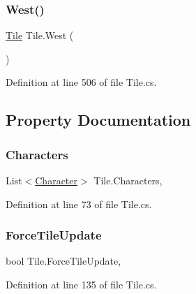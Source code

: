 \subsubsection{\texorpdfstring{West()}{West()}}
{\footnotesize\ttfamily \hyperlink{class_tile}{Tile} Tile.\+West (\begin{DoxyParamCaption}{ }\end{DoxyParamCaption})}



Definition at line 506 of file Tile.\+cs.



\subsection{Property Documentation}
\mbox{\label{class_tile_a17d6d1ccd67d0c6335de52a12c2d98a6}} 
\subsubsection{\texorpdfstring{Characters}{Characters}}
{\footnotesize\ttfamily List$<$\hyperlink{class_project_porcupine_1_1_entities_1_1_character}{Character}$>$ Tile.\+Characters\hspace{0.3cm}{\ttfamily [get]}, {\ttfamily [set]}}



Definition at line 73 of file Tile.\+cs.

\mbox{\label{class_tile_a6efbaf733ba89b602e3293d78840d8e8}} 
\subsubsection{\texorpdfstring{Force\+Tile\+Update}{ForceTileUpdate}}
{\footnotesize\ttfamily bool Tile.\+Force\+Tile\+Update\hspace{0.3cm}{\ttfamily [get]}, {}}



Definition at line 135 of file Tile.\+cs.

\mbox{\label{class_tile_a2c237270d1174c03c33afd93c7759491}} 
